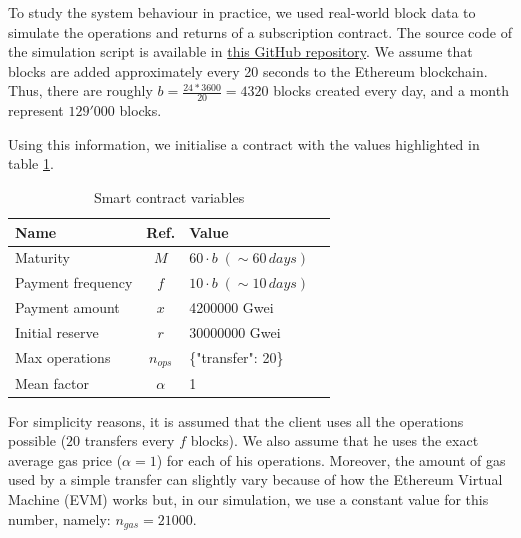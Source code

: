 To study the system behaviour in practice, we used real-world block data to simulate the operations and returns of a subscription contract. The source code of the simulation script is available in \href{https://github.com/giordano-lucas/refees/blob/simulation/Use_case_simulation.ipynb}{this GitHub repository}.
We assume that blocks are added approximately every 20 seconds to the Ethereum blockchain. Thus, there are roughly $b=\frac{24*3600}{20}=4320$ blocks created every day, and a month represent $129'000$ blocks.


Using this information, we initialise a contract with the values highlighted in table \ref{tab:variables:application-1}.

\begin{table}[htbp]
\caption{Smart contract variables}
\begin{center}
\begin{tabular}{|l|c|l|c|}
\hline
\textbf{Name} & Ref.& Value  \\
\hline
Maturity & $M$ & $60\cdot b \;(\sim 60 \,days)$\\
Payment frequency & $f$ & $10 \cdot b  \;(\sim 10 \,days)$  \\
Payment amount & $x$ & 4200000 Gwei \\
Initial reserve& $r$ & 30000000 Gwei \\
Max operations & $n_{ops}$ & \{"transfer": 20\} \\
Mean factor & $\alpha$ & 1 \\
\hline
\end{tabular}
\label{tab:variables:application-1}
\end{center}
\end{table}

For simplicity reasons, it is assumed that the client uses all the operations possible ($20$ transfers every $f$ blocks). We also assume that he uses the exact average gas price ($\alpha = 1$) for each of his operations. Moreover, the amount of gas used by a simple transfer can slightly vary because of how the Ethereum Virtual Machine (EVM) works but, in our simulation, we use a constant value for this number, namely: $n_{gas} = 21000$.


